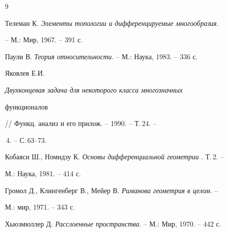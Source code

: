 \begin{thebibliography}{9} 


 




Телеман К. {\em Элементы топологии и дифференцируемые многообразия}. 


-- М.: Мир, 1967. -- 391 с. 


 




Паули В. {\em Теория относительности}. -- М.: Наука, 1983. -- 336 с. 


 




Яковлев Е.И. {\em Двухконцевая задача для некоторого класса многозначных 


функционалов} // Функц. анализ и его прилож. -- 1990. -- Т.\,24. -- 


\No\,4. -- С.\,63--73. 


 




Кобаяси Ш., Номидзу К. {\em Основы дифференциальной геометрии} . Т.\,2. -- 


М.: Наука, 1981. -- 414 с. 


 




Громол Д., Клингенберг В., Мейер В. {\em Риманова геометрия в целом}. -- 


М.: мир, 1971. -- 343 с. 


 




Хьюзмюллер Д. {\em Расслоенные пространства}. -- М.: Мир, 1970. -- 442 с. 


 


\end{thebibliography} 


 


\vskip 2cm 


 






 


 


